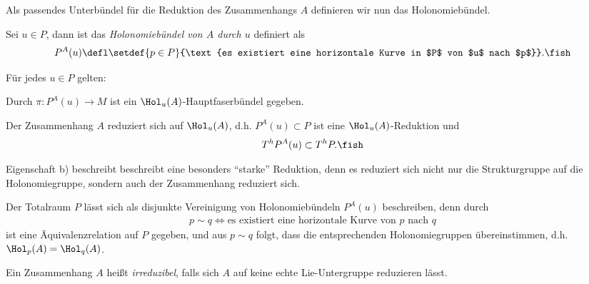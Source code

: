 \documentclass[%
	paper=a5,%
	fleqn,%
	DIV=18,%
	BCOR=0mm,
	fontsize=11pt,
	titlepage=false,%
	bibliography=totoc,
	DIV=18,%
	twoside=true,
	pdftitle=Riemannsche Geometrie,
	pdfauthor=Uwe Semmelmann,
	numbers=noendperiod]%
	{scrbook}
\begin{document}
Als passendes Unterbündel für die Reduktion des Zusammenhangs $A$ definieren wir nun das Holonomiebündel.

\begin{defn}
Sei $u\in P$, dann ist das \emph{Holonomiebündel von $A$ durch $u$} definiert als
\begin{align*}
P^A(u) \defl \setdef{p\in P}{\text{es existiert eine horizontale Kurve in $P$ von $u$ nach $p$}}.\fish
\end{align*}
\end{defn}

\begin{prop}
Für jedes $u\in P$ gelten:
\begin{propenum}
\item Durch $\pi\colon P^A(u)\to M$ ist ein $\Hol_{u}(A)$-Hauptfaserbündel gegeben.
\item Der Zusammenhang $A$ reduziert sich auf $\Hol_{u}(A)$, d.h. $P^A(u)\subset P$ ist eine $\Hol_{u}(A)$-Reduktion und
\begin{align*}
T^hP^A(u) \subset T^hP.\fish
\end{align*}
\end{propenum}
\end{prop}

\begin{rem}[Bemerkungen.]
\begin{remenum}
\item Eigenschaft b) beschreibt beschreibt eine besonders ``starke'' Reduktion, denn es reduziert sich nicht nur die Strukturgruppe auf die Holonomiegruppe, sondern auch der Zusammenhang reduziert sich.
\item Der Totalraum $P$ lässt sich als disjunkte Vereinigung von Holonomiebündeln $P^A(u)$ beschreiben, denn durch
\begin{align*}
p\sim q \iff \text{es existiert eine horizontale Kurve von $p$ nach $q$}
\end{align*}
ist eine Äquivalenzrelation auf $P$ gegeben, und aus $p\sim q$ folgt, dass die entsprechenden Holonomiegruppen übereinstimmen, d.h. $\Hol_{p}(A) = \Hol_{q}(A)$.\map
\end{remenum}
\end{rem}

\begin{defn}
Ein Zusammenhang $A$ heißt \emph{irreduzibel}, falls sich $A$ auf keine echte Lie-Untergruppe reduzieren lässt.\fish
\end{defn}
\end{document}
